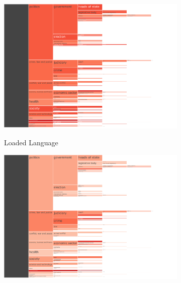 \begin{figure}[!htbp]
    \centering
	\begin{subfigure}{0.45\textwidth}
		\href{https://martinomensio.github.io/phd-project/figures/baly_iptc_weighted_prop_tech.html#Loaded_Language}{\includegraphics[trim={2.65cm 0cm 2.8cm 0cm},clip,width=\linewidth]{figures/baly_iptc_weighted_prop_tech_Loaded_Language.pdf}}
		\caption{Loaded Language}
            \label{fig:baly_iptc_weighted_prop_tech_Loaded_Language}
	\end{subfigure}
	\begin{subfigure}{0.45\textwidth}
		\href{https://martinomensio.github.io/phd-project/figures/baly_iptc_weighted_prop_tech.html#Doubt}{\includegraphics[trim={2.65cm 0cm 2.8cm 0cm},clip,width=\linewidth]{figures/baly_iptc_weighted_prop_tech_Doubt.pdf}}

\end{subfigure}
\end{figure}
